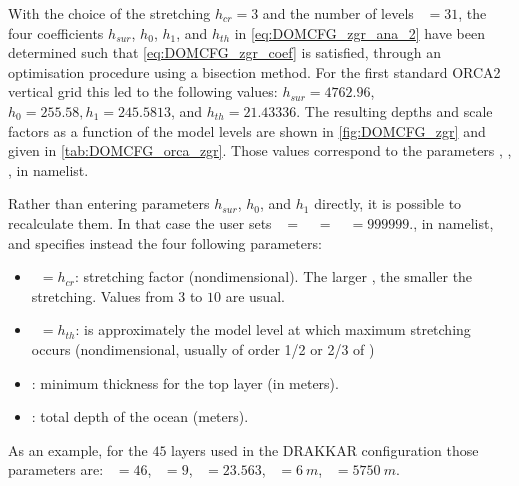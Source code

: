 \documentclass[../main/NEMO_manual]{subfiles}
\begin{document}
With the choice of the stretching $h_{cr} = 3$ and the number of levels ~$= 31$,
the four coefficients $h_{sur}$, $h_0$, $h_1$, and $h_{th}$ in
\autoref{eq:DOMCFG_zgr_ana_2} have been determined such that \autoref{eq:DOMCFG_zgr_coef}
is satisfied, through an optimisation procedure using a bisection method.
For the first standard ORCA2 vertical grid this led to the following values:
$h_{sur} = 4762.96$, $h_0 = 255.58, h_1 = 245.5813$, and $h_{th} = 21.43336$.
The resulting depths and scale factors as a function of the model levels are shown in
\autoref{fig:DOMCFG_zgr} and given in \autoref{tab:DOMCFG_orca_zgr}.
Those values correspond to the parameters , , ,  in  namelist.

Rather than entering parameters $h_{sur}$, $h_0$, and $h_1$ directly, it is possible to
recalculate them.  In that case the user sets ~$=$~~$=$~~$=
999999$., in  namelist, and specifies instead the four following parameters:
\begin{itemize}
\item {}~$= h_{cr}$: stretching factor (nondimensional).
  The larger , the smaller the stretching.
  Values from $3$ to $10$ are usual.
\item {}~$= h_{th}$: is approximately the model level at which maximum stretching occurs
  (nondimensional, usually of order 1/2 or 2/3 of )
\item {}: minimum thickness for the top layer (in meters).
\item {}: total depth of the ocean (meters).
\end{itemize}

As an example, for the $45$ layers used in the DRAKKAR configuration those parameters are:
~$= 46$, ~$= 9$, ~$= 23.563$, ~$= 6~m$,
~$= 5750~m$.
\end{document}

